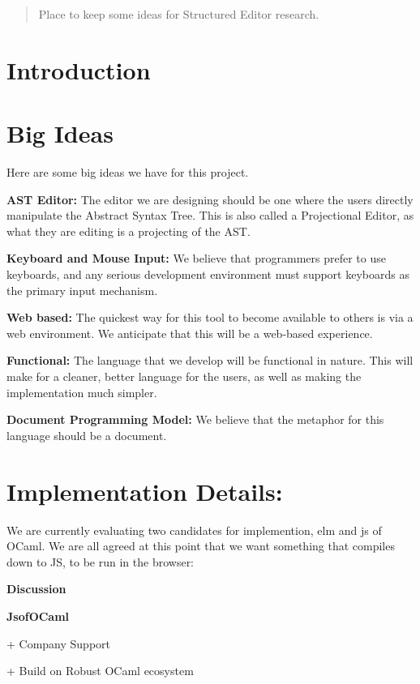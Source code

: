 \documentclass{sig-alternate-05-2015}
\begin{document}
\maketitle
\begin{abstract}
Place to keep some ideas for Structured Editor research.
\end{abstract}


\section{Introduction}

\section{Big Ideas}
Here are some big ideas we have for this project.

\textbf{AST Editor:} The editor we are designing should be one where the users directly manipulate the Abstract Syntax Tree.  This is also called a Projectional Editor, as what they are editing is a projecting of the AST.

\textbf{Keyboard and Mouse Input:} We believe that programmers prefer to use keyboards, and any serious development environment must support keyboards as the primary input mechanism.

\textbf{Web based:} The quickest way for this tool to become available to others is via a web environment.  We anticipate that this will be a web-based experience.

\textbf{Functional:} The language that we develop will be functional in nature.  This will make for a cleaner, better language for the users, as well as making the implementation much simpler.

\textbf{Document Programming Model:}  We believe that the metaphor for this language should be a document.  


\section{Implementation Details:}
We are currently evaluating two candidates for implemention, elm and js of OCaml.  We are all agreed at this point that we want something that compiles down to JS, to be run in the browser:

\textbf{Discussion}

\textbf{JsofOCaml}

+ Company Support

+ Build on Robust OCaml ecosystem
\end{document}
